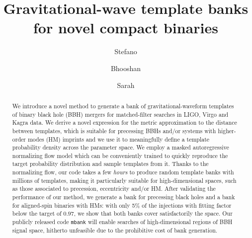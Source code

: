 \documentclass[twocolumn,showpacs,preprintnumbers,nofootinbib,prd,
superscriptaddress,10pt]{revtex4-2}
\begin{document}
\begin{abstract}
	We introduce a novel method to generate a bank of gravitational-waveform templates of binary black hole (BBH) mergers for matched-filter searches in LIGO, Virgo and Kagra data.
	We derive a novel expression for the metric approximation to the distance between templates, which is suitable for precessing BBHs and/or systems with higher-order modes (HM) imprints and we use it to meaningfully define a template probability density across the parameter space.
	We employ a masked autoregressive normalizing flow model which can be conveniently trained to quickly reproduce the target probability distribution and sample templates from it.
	Thanks to the normalizing flow, our code takes a few {\it hours} to produce random template banks with millions of templates, making it particularly suitable for high-dimensional spaces, such as those associated to precession, eccentricity and/or HM.
	After validating the performance of our method, we generate a bank for precessing black holes and a bank for aligned-spin binaries with HMs: with only 5\% of the injections with fitting factor below the target of $0.97$, we show that both banks cover satisfactorily the space.
	Our publicly released code \texttt{mbank} will enable searches of high-dimensional regions of BBH signal space, hitherto unfeasible due to the prohibitive cost of bank generation.
	
\end{abstract}
	
 \title{Gravitational-wave template banks for novel compact binaries}
	\author{Stefano  } 

	\author{Bhooshan  }
        
	\author{Sarah  }
	\maketitle
\end{document}
